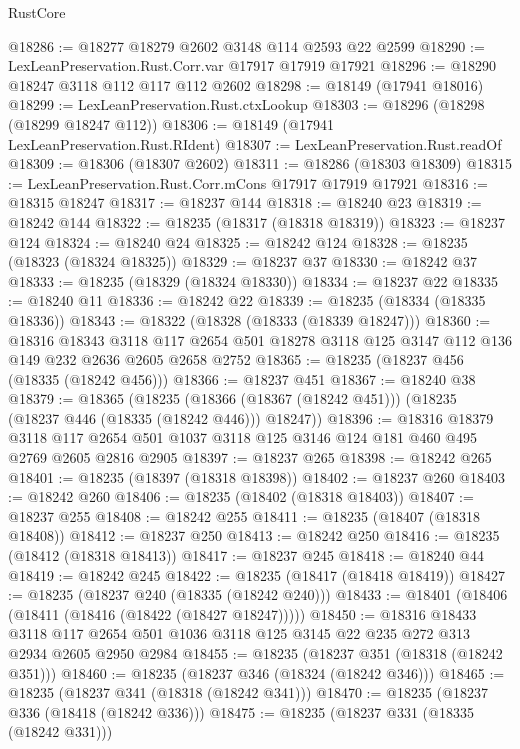 \begin{lexlean}{RustCore}
\begin{coremodule}
@18286 := @18277 @18279 @2602 @3148 @114 @2593 @22 @2599
@18290 := LexLeanPreservation.Rust.Corr.var @17917 @17919 @17921
@18296 := @18290 @18247 @3118 @112 @117 @112 @2602
@18298 := @18149 (@17941 @18016)
@18299 := LexLeanPreservation.Rust.ctxLookup
@18303 := @18296 (@18298 (@18299 @18247 @112))
@18306 := @18149 (@17941 LexLeanPreservation.Rust.RIdent)
@18307 := LexLeanPreservation.Rust.readOf
@18309 := @18306 (@18307 @2602)
@18311 := @18286 (@18303 @18309)
@18315 := LexLeanPreservation.Rust.Corr.mCons @17917 @17919 @17921
@18316 := @18315 @18247
@18317 := @18237 @144
@18318 := @18240 @23
@18319 := @18242 @144
@18322 := @18235 (@18317 (@18318 @18319))
@18323 := @18237 @124
@18324 := @18240 @24
@18325 := @18242 @124
@18328 := @18235 (@18323 (@18324 @18325))
@18329 := @18237 @37
@18330 := @18242 @37
@18333 := @18235 (@18329 (@18324 @18330))
@18334 := @18237 @22
@18335 := @18240 @11
@18336 := @18242 @22
@18339 := @18235 (@18334 (@18335 @18336))
@18343 := @18322 (@18328 (@18333 (@18339 @18247)))
@18360 := @18316
    @18343
    @3118
    @117
    @2654
    @501
    @18278
    @3118
    @125
    @3147
    @112
    @136
    @149
    @232
    @2636
    @2605
    @2658
    @2752
@18365 := @18235 (@18237 @456 (@18335 (@18242 @456)))
@18366 := @18237 @451
@18367 := @18240 @38
@18379 := @18365
    (@18235 (@18366 (@18367 (@18242 @451))) (@18235 (@18237 @446 (@18335 (@18242 @446))) @18247))
@18396 := @18316
    @18379
    @3118
    @117
    @2654
    @501
    @1037
    @3118
    @125
    @3146
    @124
    @181
    @460
    @495
    @2769
    @2605
    @2816
    @2905
@18397 := @18237 @265
@18398 := @18242 @265
@18401 := @18235 (@18397 (@18318 @18398))
@18402 := @18237 @260
@18403 := @18242 @260
@18406 := @18235 (@18402 (@18318 @18403))
@18407 := @18237 @255
@18408 := @18242 @255
@18411 := @18235 (@18407 (@18318 @18408))
@18412 := @18237 @250
@18413 := @18242 @250
@18416 := @18235 (@18412 (@18318 @18413))
@18417 := @18237 @245
@18418 := @18240 @44
@18419 := @18242 @245
@18422 := @18235 (@18417 (@18418 @18419))
@18427 := @18235 (@18237 @240 (@18335 (@18242 @240)))
@18433 := @18401 (@18406 (@18411 (@18416 (@18422 (@18427 @18247)))))
@18450 := @18316
    @18433
    @3118
    @117
    @2654
    @501
    @1036
    @3118
    @125
    @3145
    @22
    @235
    @272
    @313
    @2934
    @2605
    @2950
    @2984
@18455 := @18235 (@18237 @351 (@18318 (@18242 @351)))
@18460 := @18235 (@18237 @346 (@18324 (@18242 @346)))
@18465 := @18235 (@18237 @341 (@18318 (@18242 @341)))
@18470 := @18235 (@18237 @336 (@18418 (@18242 @336)))
@18475 := @18235 (@18237 @331 (@18335 (@18242 @331)))

\end{coremodule}
\end{lexlean}
